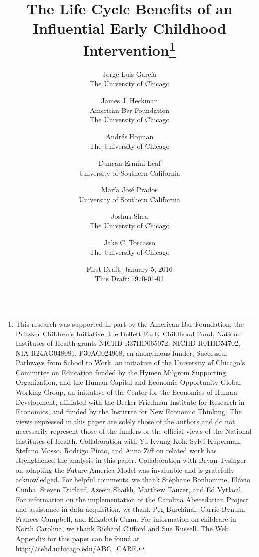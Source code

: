 








\begin{titlepage}

\title{\Large \textbf{The Life Cycle Benefits of an Influential Early Childhood Intervention}\thanks{This research was supported in part by the American Bar Foundation; the Pritzker Children's Initiative, the Buffett Early Childhood Fund, National Institutes of Health grants NICHD R37HD065072, NICHD R01HD54702, NIA R24AG048081, P30AG024968, an anonymous funder, Successful Pathways from School to Work, an initiative of the University of Chicago's Committee on Education funded by the Hymen Milgrom Supporting Organization, and the Human Capital and Economic Opportunity Global Working Group, an initiative of the Center for the Economics of Human Development, affiliated with the Becker Friedman Institute for Research in Economics, and funded by the Institute for New Economic Thinking. The views expressed in this paper are solely those of the authors and do not necessarily represent those of the funders or the official views of the National Institutes of Health. Collaboration with Yu Kyung Koh, Sylvi Kuperman, Stefano Mosso, Rodrigo Pinto, and Anna Ziff on related work has strengthened the analysis in this paper. Collaboration with Bryan Tysinger on adapting the Future America Model was invaluable and is gratefully acknowledged. For helpful comments, we thank St\'{e}phane Bonhomme, Fl\'{a}vio Cunha, Steven Durlauf, Azeem Shaikh, Matthew Tauzer, and Ed Vytlacil. For information on the implementation of the Carolina Abecedarian Project and assistance in data acquisition, we thank Peg Burchinal, Carrie Bynum, Frances Campbell, and Elizabeth Gunn. For information on childcare in North Carolina, we thank Richard Clifford and Sue Russell. The Web Appendix for this paper can be found at \url{http://cehd.uchicago.edu/ABC_CARE}.}}

\author{
Jorge Luis Garc\'{i}a\\
The University of Chicago \and
James J. Heckman \\
American Bar Foundation \\
The University of Chicago \and
Andr\'{e}s Hojman\\
The University of Chicago \and
Duncan Ermini Leaf \\
University of Southern California \and
Mar\'{i}a Jos\'{e} Prados \\
University of Southern California \and
Joshua Shea \\
The University of Chicago \and
Jake C. Torcasso\\
The University of Chicago}
\date{First Draft: January 5, 2016\\ This Draft: \today}


\end{titlepage}

